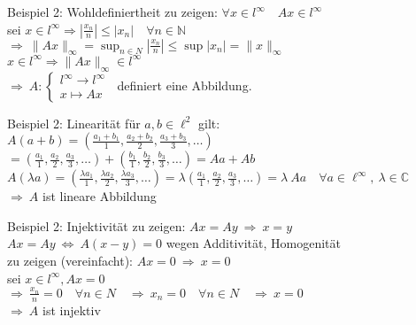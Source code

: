 \documentclass[AERbeamer%
,handout%
,optBeamerClassicFormat%
,optLeftEquations   %
]{AERlatex}
\begin{document}
%
    \begin{frame}{Beispiel 2: Wohldefiniertheit}
        \setlength{\baselineskip}{1.6\baselineskip}
        zu zeigen: $\forall x \in l^{\infty} \quad A x \in l^{\infty}$ \\
        sei $x \in l^{\infty} \Rightarrow\left|\frac{x_n}{n}\right| \leq\left|x_n\right| \quad \forall n \in \mathbb{N}$ \\
        $\Rightarrow ~ \|A x\|_{\infty}=\sup _{n \in N}\left|\frac{x_n}{n}\right| \leq \sup \left|x_n\right|=\|x\|_{\infty}$ \\
        $x \in l^{\infty} \Rightarrow\|A x\|_{\infty} \in l^{\infty}$ \\
        $\Rightarrow ~ A:\left\{\begin{array}{l}
                                    l^{\infty} \rightarrow l^{\infty} \\ x \mapsto A x
        \end{array} \right.~$ definiert eine Abbildung.
    \end{frame}
%
    \begin{frame}{Beispiel 2: Linearität}
        \setlength{\baselineskip}{1.6\baselineskip}
        für $a, b \in \ell^2$ gilt: \\
        $A(a+b)=\left(\frac{a_1+b_1}{1}, \frac{a_2+b_2}{2}, \frac{a_3+b_3}{3}, \ldots\right)$ \\ \pause
        $=\left(\frac{a_1}{1}, \frac{a_2}{2}, \frac{a_3}{3}, \ldots\right)+\left(\frac{b_1}{1}, \frac{b_2}{2}, \frac{b_3}{3}, \ldots\right)=A a+A b$ \\ \pause
        $A(\lambda a)=\left(\frac{\lambda a_1}{1}, \frac{\lambda a_2}{2}, \frac{\lambda a_3}{3}, \ldots\right)=\lambda\left(\frac{a_1}{1}, \frac{a_2}{2}, \frac{a_3}{3}, \ldots\right)=\lambda ~ A a \quad \forall a \in \ell^{\infty}, ~\lambda \in \mathbb{C}$ \\ \pause
        $\Rightarrow ~ A$  ist lineare Abbildung
    \end{frame}
%
    \begin{frame}{Beispiel 2: Injektivität}
        \setlength{\baselineskip}{1.6\baselineskip}
        zu zeigen: $A x=A y ~ \Rightarrow ~ x=y$ \\ \pause
        $A x=A y ~ \Leftrightarrow ~ A(x-y)=0$ wegen Additivität, Homogenität \\ \pause
        zu zeigen (vereinfacht): $A x=0 ~ \Rightarrow ~ x=0$ \\ \pause
        sei $x \in l^{\infty}, A x=0$ \\ \pause
        $\Rightarrow ~ \frac{x_n}{n}=0 \quad \forall n \in N \quad \Rightarrow ~ x_n=0 \quad \forall n \in N \quad \Rightarrow ~ x=0$ \\ \pause
        $\Rightarrow ~ A$ ist injektiv
    \end{frame}
\end{document}
